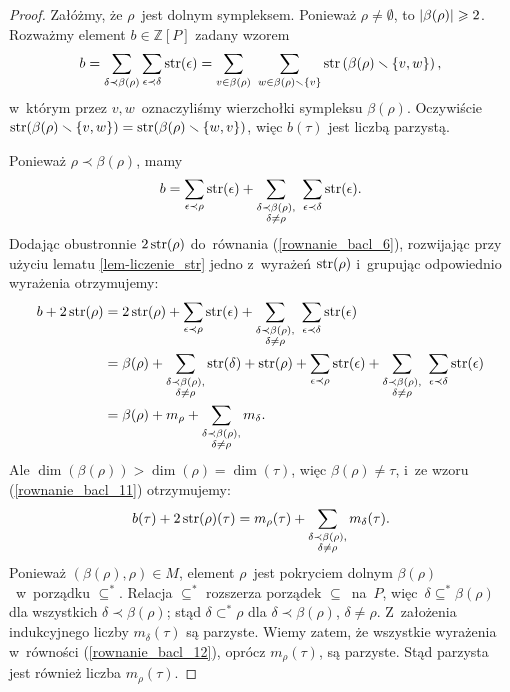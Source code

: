 \begin{proof}
Załóżmy, że $\rho$~jest dolnym sympleksem. Ponieważ $\rho\not=\emptyset$, to $\left|\beta(\rho)\right|\geqslant 2$. Rozważmy element $b\in \mathbb{Z}[P]$ zadany wzorem \[b=\sum_{\delta\prec\beta(\rho)}\sum_{\epsilon\prec\delta}\str(\epsilon)=\sum_{v\in \beta(\rho)}\ \sum_{w\in\beta(\rho)\smallsetminus\{v\}}\str\left(\beta(\rho)\smallsetminus\{v,w\}\right),\] w~którym przez $v,w$~oznaczyliśmy wierzchołki sympleksu $\beta(\rho)$. Oczywiście $\operatorname{str}(\beta(\rho)\smallsetminus\{v,w\})=\operatorname{str}(\beta(\rho)\smallsetminus\{w,v\})$, więc $b(\tau)$ jest liczbą parzystą.

Ponieważ $\rho\prec\beta(\rho)$, mamy \begin{align}
b=\sum_{\epsilon\prec\rho} \str(\epsilon) + \sum_{\substack{\delta\prec\beta(\rho),\\\delta\not=\rho}}\ \sum_{\epsilon\prec\delta}\str(\epsilon).
\label{rownanie_bacl_6}
\end{align}
Dodając obustronnie $2\operatorname{str}(\rho)$ do~równania (\ref{rownanie_bacl_6}), rozwijając przy użyciu lematu \ref{lem-liczenie_str} jedno z~wyrażeń $\operatorname{str}(\rho)$ i~grupując odpowiednio wyrażenia otrzymujemy:
\begin{align}
b+2\str(\rho)&=2\str(\rho)+\sum_{\epsilon\prec\rho}\str(\epsilon)+\sum_{\substack{\delta\prec\beta(\rho),\\\delta\not=\rho}}\ \sum_{\epsilon\prec\delta}\str(\epsilon)\nonumber\\
&=\beta(\rho)+\sum_{\substack{\delta\prec\beta(\rho),\\\delta\not=\rho}}\str(\delta)+\str(\rho)+\sum_{\epsilon\prec\rho}\str(\epsilon)+\sum_{\substack{\delta\prec\beta(\rho),\\\delta\not=\rho}}\ \sum_{\epsilon\prec\delta}\str(\epsilon)\nonumber\\
&=\beta(\rho)+m_\rho+\sum_{\substack{\delta\prec\beta(\rho),\\\delta\not=\rho}}m_\delta.\label{rownanie_bacl_11}
\end{align}
Ale $\dim(\beta(\rho))>\dim(\rho)=\dim(\tau)$, więc $\beta(\rho)\not=\tau$, i~ze wzoru (\ref{rownanie_bacl_11}) otrzymujemy:
\begin{align}b(\tau)+2\operatorname{str}(\rho)(\tau)=m_\rho(\tau)+\sum_{\substack{\delta\prec\beta(\rho),\\\delta\not=\rho}}m_\delta(\tau).\label{rownanie_bacl_12}\end{align}
Ponieważ $(\beta(\rho),\rho)\in M$, element $\rho$~jest pokryciem dolnym $\beta(\rho)$~w~porządku $\subseteq^*$. Relacja $\subseteq^*$ rozszerza porządek $\subseteq$~na~$P$, więc~$\delta\subseteq^*\beta(\rho)$ dla wszystkich $\delta\prec\beta(\rho)$; stąd $\delta\subset^*\rho$ dla $\delta\prec\beta(\rho)$, $\delta\not=\rho$. Z~założenia indukcyjnego liczby $m_\delta(\tau)$ są parzyste. Wiemy zatem, że wszystkie wyrażenia w~równości (\ref{rownanie_bacl_12}), oprócz $m_\rho(\tau)$, są parzyste. Stąd parzysta jest również liczba $m_\rho(\tau)$.
\end{proof}

